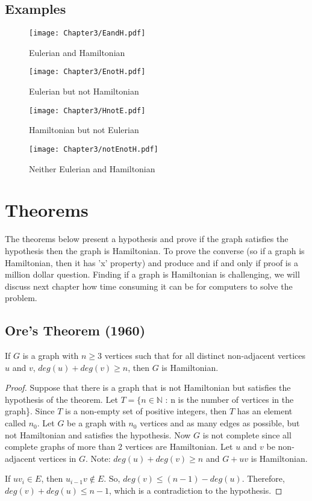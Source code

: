   \subsection{Examples}
  \begin{figure}
  	\centering
  	\texttt{[image: Chapter3/EandH.pdf]}
	\caption{Eulerian and Hamiltonian}
  \end{figure}
  \begin{figure}
  	\centering
  	\texttt{[image: Chapter3/EnotH.pdf]}
	\caption{Eulerian but not Hamiltonian}
  \end{figure}
  \begin{figure}
  	\centering
  	\texttt{[image: Chapter3/HnotE.pdf]}
	\caption{Hamiltonian but not Eulerian}
  \end{figure}
  \begin{figure}
  	\centering
  	\texttt{[image: Chapter3/notEnotH.pdf]}
	\caption{Neither Eulerian and Hamiltonian}
  \end{figure}

  \newpage

    \section{Theorems}
  The theorems below present a hypothesis and prove if the graph satisfies the hypothesis then the graph is Hamiltonian. To prove the converse (so if a graph is Hamiltonian, then it has 'x' property) and produce and if and only if proof is a million dollar question. Finding if a graph is Hamiltonian is challenging, we will discuss next chapter how time consuming it can be for computers to solve the problem. 
    \subsection{Ore's Theorem (1960)}
  If $G$ is a graph with $n \geq 3$ vertices such that for all distinct non-adjacent vertices $u$ and $v$, $deg(u) + deg(v) \geq n$, then $G$ is Hamiltonian.
    \begin{proof}
	    Suppose that there is a graph that is not Hamiltonian but satisfies the hypothesis of the theorem. Let $T = \{n \in \mathbb{N} $ : n is the number of vertices in the graph\}. Since $T$ is a non-empty set of positive integers, then $T$ has an element called $n_{0}$. Let $G$ be a graph with $n_{0}$ vertices and as many edges as possible, but not Hamiltonian and satisfies the hypothesis. Now $G$ is not complete since all complete graphs of more than 2 vertices are Hamiltonian. Let $u$ and $v$ be non-adjacent vertices in $G$. Note: $deg(u) + deg(v) \geq n$ and $G + uv$ is Hamiltonian. 
  \begin{center}
  \end{center}
    
    
    If $uv_{i} \in E$, then $u_{i-1}v \notin E$. So, $deg(v) \leq (n-1) - deg(u)$. Therefore, $deg(v) + deg(u) \leq n - 1$, which is a contradiction to the hypothesis.\cite{Ore'sTheorem}
    \end{proof}
